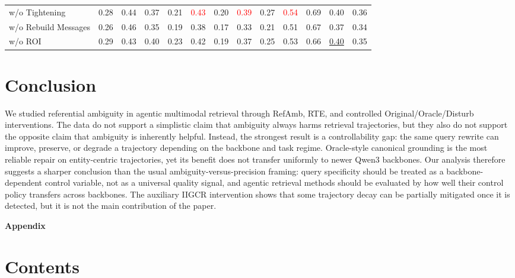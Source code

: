 \documentclass{article} %
\begin{document}
\begin{table}[htbp]
{\begin{tabular}{lcccccccccccc}
\quad w/o Tightening & 0.28 & 0.44 & 0.37 & 0.21 & \textcolor{red}{0.43} & 0.20 & \textcolor{red}{0.39} & 0.27 & \textcolor{red}{0.54} & 0.69 & 0.40 & 0.36 \\
\quad w/o Rebuild Messages & 0.26 & 0.46 & 0.35 & 0.19 & 0.38 & 0.17 & 0.33 & 0.21 & 0.51 & 0.67 & 0.37 & 0.34 \\
\quad w/o ROI & 0.29 & 0.43 & 0.40 & 0.23 & 0.42 & 0.19 & 0.37 & 0.25 & 0.53 & 0.66 & \underline{0.40} & 0.35 \\
\bottomrule
\end{tabular}%
}
\label{tab:main-baselines-tasktype-rte-lj}
\end{table}

\section{Conclusion}
We studied referential ambiguity in agentic multimodal retrieval through RefAmb, RTE, and controlled Original/Oracle/Disturb interventions.
The data do not support a simplistic claim that ambiguity always harms retrieval trajectories, but they also do not support the opposite claim that ambiguity is inherently helpful.
Instead, the strongest result is a controllability gap: the same query rewrite can improve, preserve, or degrade a trajectory depending on the backbone and task regime.
Oracle-style canonical grounding is the most reliable repair on entity-centric trajectories, yet its benefit does not transfer uniformly to newer Qwen3 backbones.
Our analysis therefore suggests a sharper conclusion than the usual ambiguity-versus-precision framing: query specificity should be treated as a backbone-dependent control variable, not as a universal quality signal, and agentic retrieval methods should be evaluated by how well their control policy transfers across backbones.
The auxiliary IIGCR intervention shows that some trajectory decay can be partially mitigated once it is detected, but it is not the main contribution of the paper.

\clearpage


\clearpage
\appendix
\onecolumn
\textbf{\Large Appendix}


\startcontents[appendix]

\vspace{1em}
\section*{Contents}
\end{document}
